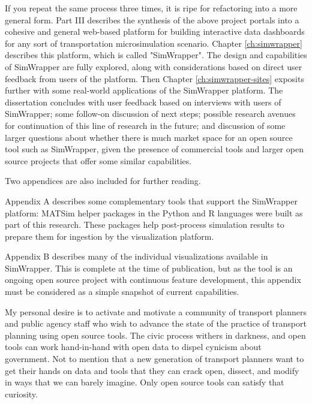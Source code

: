 If you repeat the same process three times, it is ripe for refactoring into a more general form. Part III describes the synthesis of the above project portals into a cohesive and general web-based platform for building interactive data dashboards for any sort of transportation microsimulation scenario. Chapter \ref{ch:simwrapper} describes this platform, which is called "SimWrapper". The design and capabilities of SimWrapper are fully explored, along with considerations based on direct user feedback from users of the platform. Then Chapter \ref{ch:simwrapper-sites} exposits further with some real-world applications of the SimWrapper platform. The dissertation concludes with user feedback based on interviews with users of SimWrapper; some follow-on discussion of next steps; possible research avenues for continuation of this line of research in the future; and discussion of some larger questions about whether there is much market space for an open source tool such as SimWrapper, given the presence of commercial tools and larger open source projects that offer some similar capabilities.

Two appendices are also included for further reading.

Appendix A describes some complementary tools that support the SimWrapper platform: MATSim helper packages in the Python and R languages were built as part of this research. These packages help post-process simulation results to prepare them for ingestion by the visualization platform.

Appendix B describes many of the individual visualizations available in SimWrapper. This is complete at the time of publication, but as the tool is an ongoing open source project with continuous feature development, this appendix must be considered as a simple snapshot of current capabilities.

My personal desire is to activate and motivate a community of transport planners and public agency staff who wish to advance the state of the practice of transport planning using open source tools. The civic process withers in darkness, and open tools can work hand-in-hand with open data to dispel cynicism about government. Not to mention that a new generation of transport planners want to get their hands on data and tools that they can crack open, dissect, and modify in ways that we can barely imagine. Only open source tools can satisfy that curiosity.

